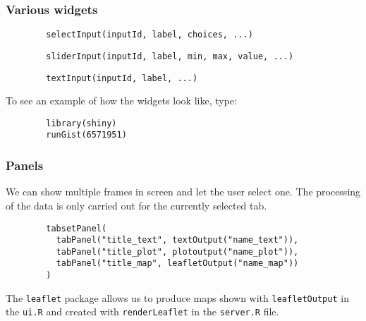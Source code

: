 \documentclass{beamer}
\begin{document}
	\begin{frame}[fragile]
		\frametitle{Various widgets}

		\begin{exampleblock}{}
		\begin{BVerbatim}
		selectInput(inputId, label, choices, ...)
		\end{BVerbatim}
		\end{exampleblock}{}

		\vspace{1em}

		\begin{exampleblock}{}
		\begin{BVerbatim}
		sliderInput(inputId, label, min, max, value, ...)
		\end{BVerbatim}
		\end{exampleblock}{}

		\vspace{1em}

		\begin{exampleblock}{}
		\begin{BVerbatim}
		textInput(inputId, label, ...)
		\end{BVerbatim}
		\end{exampleblock}{}

		\vspace{1em}

		To see an example of how the widgets look like, type:

		\vspace{1em}

		\begin{exampleblock}{}
		\begin{BVerbatim}
		library(shiny)
		runGist(6571951)
		\end{BVerbatim}
		\end{exampleblock}{}

	\end{frame}

	\begin{frame}[fragile]
		\frametitle{Panels}

		We can show multiple frames in screen and let the user select one. The processing of the data is only carried out for the currently selected tab.

		\vspace{1em}
		
		\begin{exampleblock}{}
		\begin{BVerbatim}
		tabsetPanel(
		  tabPanel("title_text", textOutput("name_text")),
		  tabPanel("title_plot", plotoutput("name_plot")),
		  tabPanel("title_map", leafletOutput("name_map"))
		)
		\end{BVerbatim}
		\end{exampleblock}{}

		\vspace{1em}

		The \verb|leaflet| package allows us to produce maps shown with \verb|leafletOutput| in the \verb|ui.R| and created with \verb|renderLeaflet| in the \verb|server.R| file.

	\end{frame}
\end{document}
